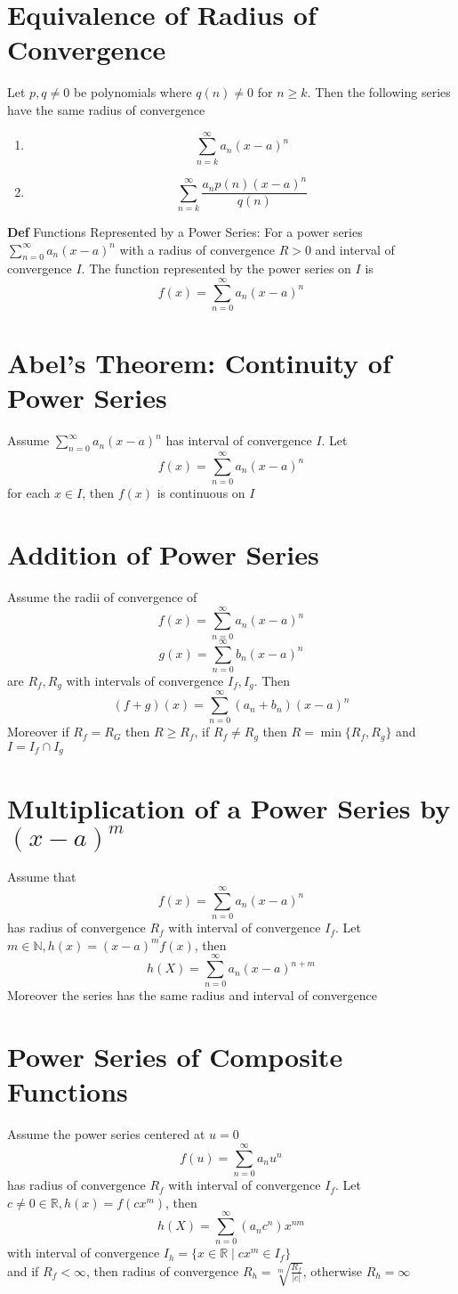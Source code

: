\documentclass[11pt,notitlepage]{report}
\begin{document}
\section{Equivalence of Radius of Convergence}Let $p ,q \ne 0$ be polynomials where $q(n) \ne 0$ for $n \geq k$. Then the following series have the same radius of convergence
\begin{enumerate}
    \item $$\sum_{n=k}^\infty a_n(x-a)^n$$
    \item $$\sum_{n=k}^\infty \frac{a_n p(n) (x-a)^n}{q(n)}$$
\end{enumerate}

\textbf{Def} Functions Represented by a Power Series: For a power series $\sum^\infty_{n=0} a_n(x-a)^n$ with a radius of convergence $R > 0$ and interval of convergence $I$. The function represented by the power series on $I$ is
$$f(x) = \sum_{n=0}^\infty a_n(x-a)^n$$

\section{Abel’s Theorem: Continuity of Power Series}Assume $\sum_{n=0}^\infty a_n(x-a)^n$ has interval of convergence $I$. Let
$$f(x) = \sum_{n=0}^\infty a_n(x-a)^n$$
for each $x \in I$, then $f(x)$ is continuous on $I$

\section{Addition of Power Series}Assume the radii of convergence of
$$f(x) = \sum_{n=0}^\infty a_n(x-a)^n$$
$$g(x) = \sum_{n=0}^\infty b_n(x-a)^n$$
are $R_f, R_g$ with intervals of convergence $I_f, I_g$. Then
$$(f + g)(x) = \sum_{n=0}^\infty (a_n+b_n)(x-a)^n$$
Moreover if $R_f = R_G$ then $R \geq R_f$, if $R_f \ne R_g$ then $R = \min\{R_f, R_g\}$ and $I = I_f \cap I_g$

\section{Multiplication of a Power Series by \texorpdfstring{$(x-a)^m$}{(x-a)m}}
Assume that
$$f(x) = \sum_{n=0}^\infty a_n(x-a)^n$$
has radius of convergence $R_f$ with interval of convergence $I_f$. Let $m \in \mathbb N, h(x) = (x-a)^m f(x)$, then
$$h(X) = \sum_{n=0}^\infty a_n(x-a)^{n+m}$$
Moreover the series has the same radius and interval of convergence

\section{Power Series of Composite Functions}Assume the power series centered at $u=0$
$$f(u) = \sum_{n=0}^\infty a_n u^n$$
has radius of convergence $R_f$ with interval of convergence $I_f$. Let $c \ne 0 \in \mathbb R, h(x) = f(cx^m)$, then
$$h(X) = \sum_{n=0}^\infty (a_n c^n) x^{nm}$$
with interval of convergence $I_h =\{x \in \mathbb R \mid c x^m \in I_f\}$\\
and if $R_f < \infty$, then radius of convergence $R_h = \sqrt[m]{\frac{R_f}{|c|}}$, otherwise $R_h = \infty$
\end{document}
